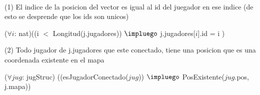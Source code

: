 \begin{Representacion}
    \begin{Tupla}[pokeStruc]
    \end{Tupla}
    
    
    \begin{Tupla}[jugStruc]
    \end{Tupla}


$ $\newline
$ $\newline


$ $\newline

(1) El indice de la posicion del vector es igual al id del juegador en ese indice (de esto se desprende que los ids son unicos) $ $\newline

($\forall i$: nat)((i $<$ Longitud(j.jugadores)) $\impluego$ j.jugadores[$i$].id = i )
$ $\newline


(2) Todo jugador de j.jugadores que este conectado, tiene una posicion que es una coordenada existente en el mapa $ $\newline

($\forall jug$: jugStruc) ((esJugadorConectado($jug$)) $\impluego$ PosExistente($jug$.pos, j.mapa))
$ $\newline



\end{Representacion}
